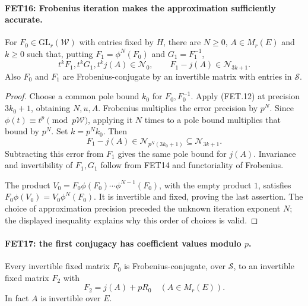 \documentclass[11pt,a4paper]{article}
\numberwithin{equation}{section}
\theoremstyle{remark}\newtheorem{remark}[theorem]{Remark}
\begin{document}
\paragraph{FET16: Frobenius iteration makes the approximation sufficiently accurate.}
\label{claim:FET16}
For $F_0\in\mathrm{GL}_r(\mathcal W)$ with entries fixed by
$H$, there are $N\geq0$, $A\in M_r(E)$ and $k\geq0$ such that,
putting $F_1=\phi^N(F_0)$ and $G_1=F_1^{-1}$,
\[
 t^k F_1, t^kG_1, t^k j(A)\in\mathcal N_0,\qquad
                       F_1-j(A)\in\mathcal N_{3k+1}.
                                                               \tag{FET.14}
\]
Also $F_0$ and $F_1$ are Frobenius-conjugate by an invertible
matrix with entries in $\mathcal S$.

\begin{proof}
Choose a common pole bound $k_0$ for $F_0,F_0^{-1}$.
Apply (FET.12) at precision $3k_0+1$, obtaining $N,u,A$.
Frobenius multiplies the error precision by $p^N$.
Since $\phi(t)\equiv t^p\pmod {p\mathcal W}$, applying it
$N$ times to a pole bound multiplies that bound by $p^N$.
Set $k=p^N k_0$. Then
\[
 F_1-j(A)\in\mathcal N_{p^N(3k_0+1)}
                        \subseteq\mathcal N_{3k+1}.
\]
Subtracting this error from $F_1$ gives the same pole bound
for $j(A)$. Invariance and invertibility of $F_1,G_1$ follow
from FET14 and functoriality of Frobenius.

The product
$V_0=F_0\phi(F_0)\cdots\phi^{N-1}(F_0)$, with the empty
product $1$, satisfies
$F_0\phi(V_0)=V_0\phi^N(F_0)$.
It is invertible and fixed, proving the last assertion.
The choice of approximation precision preceded the unknown
iteration exponent $N$; the displayed inequality explains why
this order of choices is valid.
\end{proof}

\paragraph{FET17: the first conjugacy has coefficient values modulo $p$.}
\label{claim:FET17}
Every invertible fixed matrix $F_0$ is Frobenius-conjugate,
over $\mathcal S$, to an invertible fixed matrix $F_2$ with
\[
                              F_2=j(A)+pR_0
                             \quad(A\in M_r(E)).           \tag{FET.15}
\]
In fact $A$ is invertible over $E$.
\end{document}
